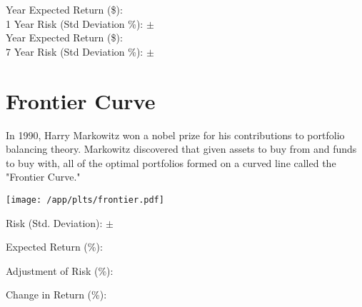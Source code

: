 \documentclass{article}
\begin{document}
 Year Expected Return (\$): {} \quad \emph{{}}\\
1 Year Risk (Std Deviation \%): $\pm$ {}
\\
 Year Expected Return (\$): {} \quad \emph{{}}\\
7 Year Risk (Std Deviation \%): $\pm$ {}



\newpage    %



\section{Frontier Curve}

In 1990, Harry Markowitz won a nobel prize for his contributions to portfolio balancing theory. Markowitz discovered that given assets to buy from and funds to buy with, all of the optimal portfolios formed on a curved line called the "Frontier Curve."

\vspace{2cm}

\hspace*{-2.5cm}\texttt{[image: /app/plts/frontier.pdf]}\par

\vspace{1cm}

Risk (Std. Deviation): $\pm$ {}

Expected Return (\%): {}

Adjustment of Risk (\%): {}

Change in Return (\%): {}


\newpage    %
\end{document}
